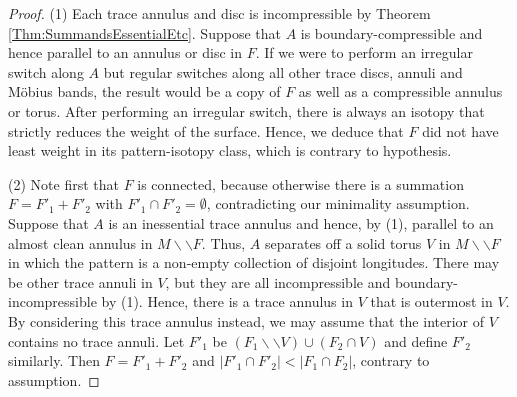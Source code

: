 \documentclass[oneside]{amsart}
\numberwithin{equation}{section}
\theoremstyle{plain}
\theoremstyle{definition}
\newcommand{\cut}{\backslash\backslash}
\begin{document}
\begin{proof}
(1) Each trace annulus and disc is incompressible by Theorem \ref{Thm:SummandsEssentialEtc}. Suppose that $A$ is boundary-compressible and hence parallel to an annulus or disc in $F$. If we were to perform an irregular switch along $A$ but regular switches along all other trace discs, annuli and M\"obius bands, the result would be a copy of $F$ as well as a compressible annulus or torus. After performing an irregular switch, there is always an isotopy that strictly reduces the weight of the surface. Hence, we deduce that $F$ did not have least weight in its pattern-isotopy class, which is contrary to hypothesis.

(2) Note first that $F$ is connected, because otherwise there is a summation $F = F'_1 + F'_2$ with $F'_1 \cap F'_2 = \emptyset$, contradicting our minimality assumption. Suppose that $A$ is an inessential trace annulus and hence, by (1), parallel to an almost clean annulus in $M \cut F$. Thus, $A$ separates off a solid torus $V$ in $M \cut F$ in which the pattern is a non-empty collection of disjoint longitudes. There may be other trace annuli in $V$, but they are all incompressible and boundary-incompressible by (1). Hence, there is a trace annulus in $V$ that is outermost in $V$. By considering this trace annulus instead, we may assume that the interior of $V$ contains no trace annuli. Let $F'_1$ be $(F_1 \cut V) \cup (F_2 \cap V)$ and define $F'_2$ similarly. Then $F = F'_1 + F'_2$ and $|F'_1 \cap F'_2| < |F_1 \cap F_2|$, contrary to assumption.


\end{proof}
\end{document}
